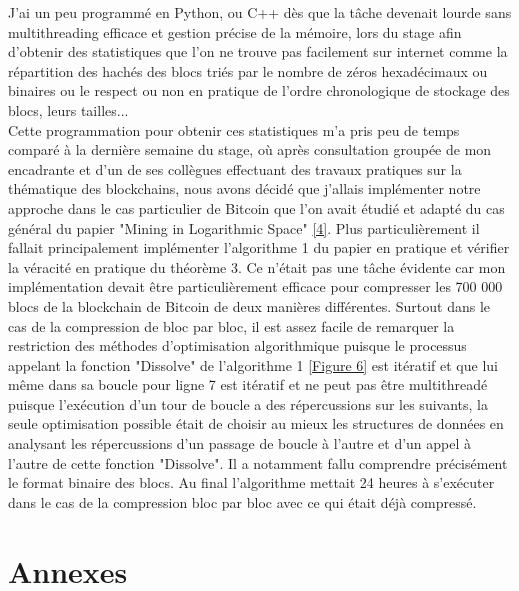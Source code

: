 \documentclass[12pt,a4paper]{article}
\newcommand{\source}[1]{\hyperlink{#1}{[#1]}}
\newcommand{\annexe}[2]{\hyperlink{#1}{[Figure #2]}}
\begin{document}
	J'ai un peu programmé en Python, ou C++ dès que la tâche devenait lourde sans multithreading efficace et gestion précise de la mémoire, lors du stage afin d'obtenir des statistiques que l'on ne trouve pas facilement sur internet comme la répartition des hachés des blocs triés par le nombre de zéros hexadécimaux ou binaires ou le respect ou non en pratique de l'ordre chronologique de stockage des blocs, leurs tailles...\\ %
	Cette programmation pour obtenir ces statistiques m'a pris peu de temps comparé à la dernière semaine du stage, où après consultation groupée de mon encadrante et d'un de ses collègues effectuant des travaux pratiques sur la thématique des blockchains, nous avons décidé que j'allais implémenter notre approche dans le cas particulier de Bitcoin que l'on avait étudié et adapté du cas général du papier "Mining in Logarithmic Space" \source{4}. Plus particulièrement il fallait principalement implémenter l'algorithme 1 du papier en pratique et vérifier la véracité en pratique du théorème 3. Ce n'était pas une tâche évidente car mon implémentation devait être particulièrement efficace pour compresser les 700 000 blocs de la blockchain de Bitcoin de deux manières différentes. Surtout dans le cas de la compression de bloc par bloc, il est assez facile de remarquer la restriction des méthodes d'optimisation algorithmique puisque le processus appelant la fonction "Dissolve" de l'algorithme 1 \annexe{26}{6} est itératif et que lui même dans sa boucle pour ligne 7 est itératif et ne peut pas être multithreadé puisque l'exécution d'un tour de boucle a des répercussions sur les suivants, la seule optimisation possible était de choisir au mieux les structures de données en analysant les répercussions d'un passage de boucle à l'autre et d'un appel à l'autre de cette fonction "Dissolve". Il a notamment fallu comprendre précisément le format binaire des blocs. Au final l'algorithme mettait 24 heures à s'exécuter dans le cas de la compression bloc par bloc avec ce qui était déjà compressé. %
	
	\newpage
	
	\section{Annexes}
	
\end{document}
